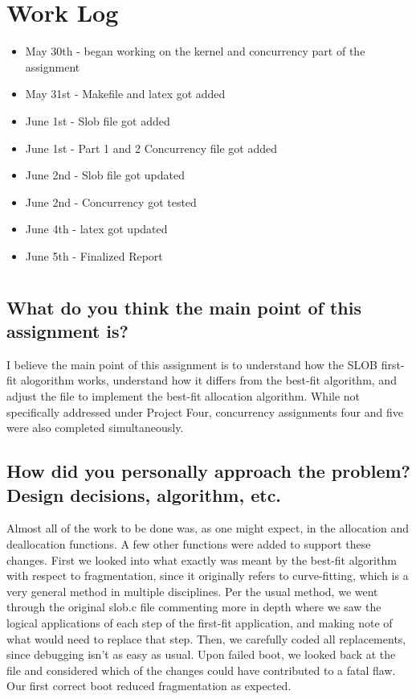\documentclass[draftclsnofoot,onecolumn,10pt,compsoc]{IEEEtran}
\begin{document}
\section{Work Log}
\begin{itemize}
	\item May 30th - began working on the kernel and concurrency part of the assignment
	\item May 31st - Makefile and latex got added
	\item June 1st - Slob file got added
	\item June 1st - Part 1 and 2 Concurrency file got added
	\item June 2nd - Slob file got updated
	\item June 2nd - Concurrency got tested
	\item June 4th - latex got updated
	\item June 5th - Finalized Report
	
	
	
	
	
\end{itemize}
\section{}
\subsection{What do you think the main point of this assignment is?}
 I believe the main point of this assignment is to understand how the SLOB first-fit alogorithm works, understand how it differs from the best-fit algorithm, and adjust the file to implement the best-fit allocation algorithm. While not specifically addressed under Project Four, concurrency assignments four and five were also completed simultaneously.
\subsection{How did you personally approach the problem? Design decisions, algorithm, etc.}
Almost all of the work to be done was, as one might expect, in the allocation and deallocation functions. A few other functions were added to support these changes. First we looked into what exactly was meant by the best-fit algorithm with respect to fragmentation, since it originally refers to curve-fitting, which is a very general method in multiple disciplines. Per the usual method, we went through the original slob.c file commenting more in depth where we saw the logical applications of each step of the first-fit application, and making note of what would need to replace that step. Then, we carefully coded all replacements, since debugging isn't as easy as usual. Upon failed boot, we looked back at the file and considered which of the changes could have contributed to a fatal flaw. Our first correct boot reduced fragmentation as expected.
\end{document}
